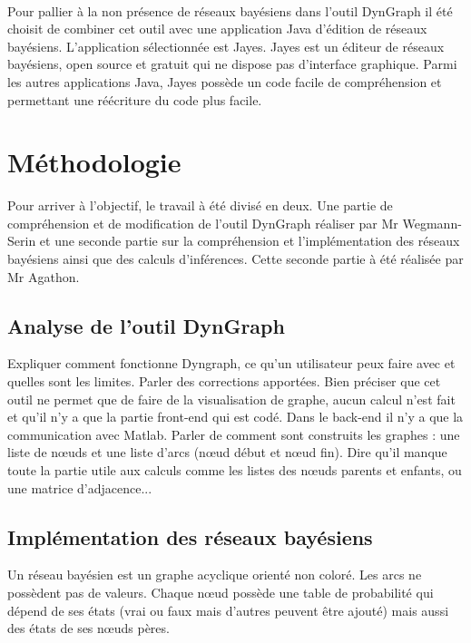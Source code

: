 \documentclass[conference]{IEEEtran}
\begin{document}
\\
Pour pallier à la non présence de réseaux bayésiens dans l'outil DynGraph il été choisit de combiner cet outil avec une application Java d'édition de réseaux bayésiens. L'application sélectionnée est Jayes. Jayes est un éditeur de réseaux bayésiens, open source et gratuit qui ne dispose pas d'interface graphique. Parmi les autres applications Java, Jayes possède un code facile de compréhension et permettant une réécriture du code plus facile.




\section{Méthodologie}

Pour arriver à l'objectif, le travail à été divisé en deux. Une partie de compréhension et de modification de l'outil DynGraph réaliser par Mr Wegmann-Serin et une seconde partie sur la compréhension et l'implémentation des réseaux bayésiens ainsi que des calculs d'inférences. Cette seconde partie à été réalisée par Mr Agathon. \\


\subsection{Analyse de l'outil DynGraph}

Expliquer comment fonctionne Dyngraph, ce qu'un utilisateur peux faire avec et quelles sont les limites. Parler des corrections apportées. Bien préciser que cet outil ne permet que de faire de la visualisation de graphe, aucun calcul n'est fait et qu'il n'y a que la partie front-end qui est codé. Dans le back-end il n'y a que la communication avec Matlab.
Parler de comment sont construits les graphes : une liste de nœuds et une liste d'arcs (nœud début et nœud fin). Dire qu'il manque toute la partie utile aux calculs comme les listes des nœuds parents et enfants, ou une matrice d'adjacence... 

\subsection{Implémentation des réseaux bayésiens}

Un réseau bayésien est un graphe acyclique orienté non coloré. Les arcs ne possèdent pas de valeurs. Chaque nœud possède une table de probabilité qui dépend de ses états (vrai ou faux mais d'autres peuvent être ajouté) mais aussi des états de ses nœuds pères. \\
\end{document}

